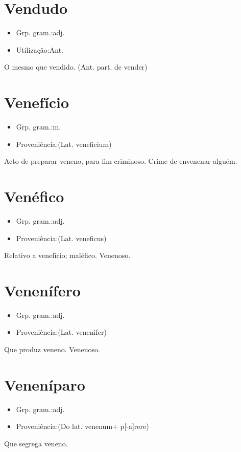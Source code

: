 \documentclass{article}
\begin{document}
\section{Vendudo}
\begin{itemize}
\item {Grp. gram.:adj.}
\end{itemize}
\begin{itemize}
\item {Utilização:Ant.}
\end{itemize}
O mesmo que \textunderscore vendido\textunderscore .
(Ant. part. de \textunderscore vender\textunderscore )
\section{Venefício}
\begin{itemize}
\item {Grp. gram.:m.}
\end{itemize}
\begin{itemize}
\item {Proveniência:(Lat. \textunderscore veneficium\textunderscore )}
\end{itemize}
Acto de preparar veneno, para fim criminoso.
Crime de envenenar alguém.
\section{Venéfico}
\begin{itemize}
\item {Grp. gram.:adj.}
\end{itemize}
\begin{itemize}
\item {Proveniência:(Lat. \textunderscore veneficus\textunderscore )}
\end{itemize}
Relativo a venefício; maléfico.
Venenoso.
\section{Venenífero}
\begin{itemize}
\item {Grp. gram.:adj.}
\end{itemize}
\begin{itemize}
\item {Proveniência:(Lat. \textunderscore venenifer\textunderscore )}
\end{itemize}
Que produz veneno.
Venenoso.
\section{Veneníparo}
\begin{itemize}
\item {Grp. gram.:adj.}
\end{itemize}
\begin{itemize}
\item {Proveniência:(Do lat. \textunderscore venenum\textunderscore  + \textunderscore p[-a]rere\textunderscore )}
\end{itemize}
Que segrega veneno.
\end{document}
